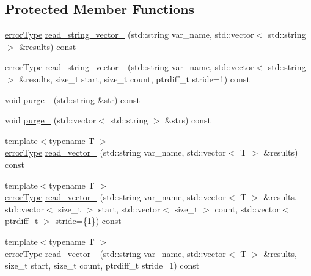\subsection*{Protected Member Functions}
\begin{DoxyCompactItemize}
\item 
\mbox{\hyperlink{class_an_en_i_o_aa56bc1ec6610b86db4349bce20f9ead0}{error\+Type}} \mbox{\hyperlink{class_an_en_i_o_ae9cf0a8cde2b742992295ccc2bed17ef}{read\+\_\+string\+\_\+vector\+\_\+}} (std\+::string var\+\_\+name, std\+::vector$<$ std\+::string $>$ \&results) const
\item 
\mbox{\hyperlink{class_an_en_i_o_aa56bc1ec6610b86db4349bce20f9ead0}{error\+Type}} \mbox{\hyperlink{class_an_en_i_o_a8c7e28931fd88831922e64ad87ee03f2}{read\+\_\+string\+\_\+vector\+\_\+}} (std\+::string var\+\_\+name, std\+::vector$<$ std\+::string $>$ \&results, size\+\_\+t start, size\+\_\+t count, ptrdiff\+\_\+t stride=1) const
\item 
void \mbox{\hyperlink{class_an_en_i_o_ae8ed483b1dcdbf2a15148d60f8067595}{purge\+\_\+}} (std\+::string \&str) const
\item 
void \mbox{\hyperlink{class_an_en_i_o_a7be5ab5c8c42fc9a04e4deeb0059a54d}{purge\+\_\+}} (std\+::vector$<$ std\+::string $>$ \&strs) const
\item 
{\footnotesize template$<$typename T $>$ }\\\mbox{\hyperlink{class_an_en_i_o_aa56bc1ec6610b86db4349bce20f9ead0}{error\+Type}} \mbox{\hyperlink{class_an_en_i_o_aa135f278f8ff2a028b8119f483dd36bf}{read\+\_\+vector\+\_\+}} (std\+::string var\+\_\+name, std\+::vector$<$ T $>$ \&results) const
\item 
{\footnotesize template$<$typename T $>$ }\\\mbox{\hyperlink{class_an_en_i_o_aa56bc1ec6610b86db4349bce20f9ead0}{error\+Type}} \mbox{\hyperlink{class_an_en_i_o_a4a4b8eedb372df1bb46b2104ae2761cd}{read\+\_\+vector\+\_\+}} (std\+::string var\+\_\+name, std\+::vector$<$ T $>$ \&results, std\+::vector$<$ size\+\_\+t $>$ start, std\+::vector$<$ size\+\_\+t $>$ count, std\+::vector$<$ ptrdiff\+\_\+t $>$ stride=\{1\}) const
\item 
{\footnotesize template$<$typename T $>$ }\\\mbox{\hyperlink{class_an_en_i_o_aa56bc1ec6610b86db4349bce20f9ead0}{error\+Type}} \mbox{\hyperlink{class_an_en_i_o_a9a0c27d0baddc7e27b25e1d13ac4f313}{read\+\_\+vector\+\_\+}} (std\+::string var\+\_\+name, std\+::vector$<$ T $>$ \&results, size\+\_\+t start, size\+\_\+t count, ptrdiff\+\_\+t stride=1) const
\end{DoxyCompactItemize}
